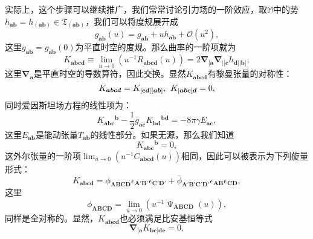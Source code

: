 实际上，这个步骤可以继续推广，我们常常讨论引力场的一阶效应，取$\mathbb{M}$中的势$h_{\boldsymbol{ab}} =h_{(\boldsymbol{ab})} \in \mathfrak{T}_{(\boldsymbol{ab})}$，我们可以将度规展开成
\begin{equation*}
	g_{\boldsymbol{ab}}( u) =g_{\boldsymbol{ab}} +uh_{\boldsymbol{ab}} +\mathcal{O} (u^{2} ),
\end{equation*}
这里$g_{\boldsymbol{ab}} =g_{\boldsymbol{ab}}( 0)$为平直时空的度规。那么曲率的一阶项就为
\begin{equation}
	K_{\boldsymbol{abcd}} \equiv \lim _{u\rightarrow 0} (u^{-1} R_{\boldsymbol{abcd}} (u))=2\mathbf{\nabla }_{[\boldsymbol{a}}\mathbf{\nabla }_{|[\boldsymbol{c}} h_{\boldsymbol{d}] |\boldsymbol{b}]} ,
	\label{eq:6.43}
\end{equation}
这里$\mathbf{\nabla }_{\boldsymbol{a}}$是平直时空的导数算符，因此交换。显然$K_{\boldsymbol{abcd}}$有黎曼张量的对称性：
\begin{equation*}
	K_{\boldsymbol{abcd}} =K_{[\boldsymbol{cd}][\boldsymbol{ab}]} ,\kern+0.4em K_{[\boldsymbol{abc}]\boldsymbol{d}} =0,
\end{equation*}
同时爱因斯坦场方程的线性项为：
\begin{equation*}
	K{_{\boldsymbol{abc}}}^{\boldsymbol{b}} -\frac{1}{2} g_{\boldsymbol{ac}} K{_{\boldsymbol{bd}}}^{\boldsymbol{bd}} =-8\pi \gamma E_{\boldsymbol{ac}} ,
\end{equation*}
这里$E_{\boldsymbol{ab}}$是能动张量$T_{\boldsymbol{ab}}$的线性部分。如果无源，那么我们知道
\begin{equation*}
	K{_{\boldsymbol{abc}}}^{\boldsymbol{b}} =0,
\end{equation*}
这外尔张量的一阶项$\lim _{u\rightarrow 0} (u^{-1} C_{\boldsymbol{abcd}}( u) )$相同，因此可以被表示为下列旋量形式：
\begin{equation*}
	K_{\boldsymbol{abcd}} =\phi _{\boldsymbol{ABCD}} \epsilon _{\boldsymbol{A} '\boldsymbol{B} '} \epsilon _{\boldsymbol{C} '\boldsymbol{D} '} +\overline{\phi }_{\boldsymbol{A} '\boldsymbol{B} '\boldsymbol{C} '\boldsymbol{D} '} \epsilon _{\boldsymbol{AB}} \epsilon _{\boldsymbol{CD}} ,
\end{equation*}
这里
\begin{equation*}
	\phi _{\boldsymbol{ABCD}} =\lim _{u\rightarrow 0} (u^{-1} \upPsi _{\boldsymbol{ABCD}}( u) ),
\end{equation*}
同样是全对称的。显然，$K_{\boldsymbol{abcd}}$也必须满足比安基恒等式
\begin{equation*}
	\mathbf{\nabla }_{[\boldsymbol{a}} K_{\boldsymbol{bc}]\boldsymbol{de}} =0,
\end{equation*}
